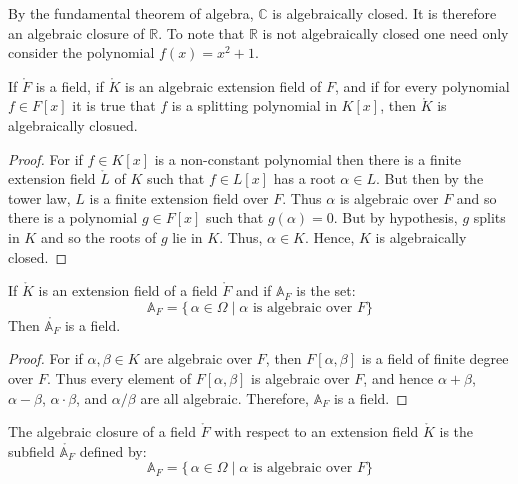 \documentclass{article}                                                        %
\begin{document}
        \begin{example}
            By the fundamental theorem of algebra, $\mathbb{C}$ is algebraically
            closed. It is therefore an algebraic closure of $\mathbb{R}$. To
            note that $\mathbb{R}$ is not algebraically closed one need only
            consider the polynomial $f(x)=x^{2}+1$.
        \end{example}
        \begin{theorem}
            If $\ring{F}$ is a field, if $\ring{K}$ is an algebraic extension
            field of $F$, and if for every polynomial $f\in{F}[x]$ it is true
            that $f$ is a splitting polynomial in $K[x]$, then $\ring{K}$ is
            algebraically closued.
        \end{theorem}
        \begin{proof}
            For if $f\in{K}[x]$ is a non-constant polynomial then there is a
            finite extension field $\ring{L}$ of $K$ such that $f\in{L}[x]$ has
            a root $\alpha\in{L}$. But then by the tower law, $L$ is a finite
            extension field over $F$. Thus $\alpha$ is algebraic over $F$ and
            so there is a polynomial $g\in{F}[x]$ such that $g(\alpha)=0$. But
            by hypothesis, $g$ splits in $K$ and so the roots of $g$ lie in
            $K$. Thus, $\alpha\in{K}$. Hence, $K$ is algebraically closed.
        \end{proof}
        \begin{theorem}
            If $\ring{K}$ is an extension field of a field $\ring{F}$ and if
            $\mathbb{A}_{F}$ is the set:
            \begin{equation}
                \mathbb{A}_{F}=\{\,\alpha\in\Omega\;|\;
                    \alpha\textrm{ is algebraic over }F\}
            \end{equation}
            Then $\ring{\mathbb{A}_{F}}$ is a field.
        \end{theorem}
        \begin{proof}
            For if $\alpha,\beta\in{K}$ are algebraic over $F$, then
            $F[\alpha,\beta]$ is a field of finite degree over $F$. Thus every
            element of $F[\alpha,\beta]$ is algebraic over $F$, and hence
            $\alpha+\beta$, $\alpha-\beta$, $\alpha\cdot\beta$, and
            $\alpha/\beta$ are all algebraic. Therefore, $\mathbb{A}_{F}$ is a
            field.
        \end{proof}
        \begin{definition}
            The algebraic closure of a field $\ring{F}$ with respect to an
            extension field $\ring{K}$ is the subfield $\ring{\mathbb{A}_{F}}$
            defined by:
            \begin{equation}
                \mathbb{A}_{F}=\{\,\alpha\in\Omega\;|\;
                \alpha\textrm{ is algebraic over }F\}
            \end{equation}
        \end{definition}
\end{document}
